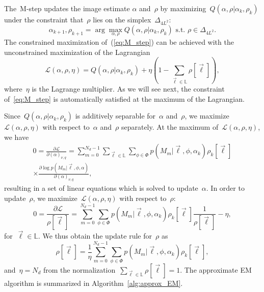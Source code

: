 \documentclass{article}
\begin{document}
The~\mbox{M-step} updates the image estimate $\alpha$ and~$\rho$ by maximizing~$Q(\alpha, \rho|\alpha_k, \rho_k)$ under the constraint that~$\rho$ lies on the simplex~$\Delta_{4L^2}$:
\begin{equation}
\label{eq:M_step}
\alpha_{k+1}, \rho_{k+1} = \arg \max_{\alpha, \rho} Q(\alpha, \rho|\alpha_k, \rho_k) \text{ s.t. } \rho \in \Delta_{4L^2}.
\end{equation}
The constrained maximization of~(\ref{eq:M_step}) can be achieved with the unconstrained maximization of the Lagrangian
\begin{equation}
\mathcal{L}(\alpha, \rho, \eta) = Q(\alpha, \rho|\alpha_k, \rho_k) + \eta \left(1 - \sum_{\vec{\ell} \in \mathbb{L}} \rho[\vec{\ell}] \right),
\end{equation}
where~$\eta$ is the Lagrange multiplier. As we will see next, the constraint of~\eqref{eq:M_step} is automatically satisfied at the   maximum of the Lagrangian.

 Since~$Q(\alpha, \rho|\alpha_k, \rho_k)$ is additively separable for~$\alpha$ and~$\rho$, we maximize~$\mathcal{L}(\alpha, \rho, \eta)$ with respect to~$\alpha$ and~$\rho$ separately. At the maximum of~$\mathcal{L}(\alpha, \rho, \eta)$, we have
\begin{multline}
\label{eq:update_alpha}
0 = \frac{\partial \mathcal{L}}{\partial{(\alpha)_{\nu, q}}} =  \sum_{m = 0}^{N_d - 1} \sum_{\vec{\ell} \in \mathbb{L}} \sum_{\phi \in \Phi} p(M_m|\vec{\ell}, \phi, \alpha_k) \rho_k[\vec{\ell}] \\ \times \frac{\partial \log p(M_m|\vec{\ell}, \phi, \alpha)}{\partial{(\alpha)_{\nu, q}}},
\end{multline}
resulting in a set of linear equations which is solved to update~$\alpha$. In order to update~$\rho$, we maximize~$\mathcal{L}(\alpha, \rho, \eta)$ with
respect to~$\rho$:
\begin{equation}
0 = \frac{\partial \mathcal{L}}{\mathcal \rho[\vec{\ell}]} = \sum_{m = 0}^{N_d - 1} \sum_{\phi \in \Phi} p(M_m|\vec{\ell}, \phi, \alpha_k) \rho_k[\vec{\ell}] \frac{1}{\rho[\vec{\ell}]} - \eta,
\end{equation}
for~$\vec{\ell} \in \mathbb{L}$. We thus obtain the update rule for~$\rho$ as
\begin{equation}
\label{eq:update_rho}
\rho[\vec{\ell}] = \frac{1}{\eta} \sum_{m = 0}^{N_d - 1} \sum_{\phi \in \Phi} p(M_m|\vec{\ell}, \phi, \alpha_k) \rho_k[\vec{\ell}],
\end{equation}
and~$\eta = N_d$ from the normalization~\mbox{$\sum_{\vec{\ell} \in \mathbb{L}} \rho[\vec{\ell}] = 1$}. The approximate EM algorithm is summarized in Algorithm~\ref{alg:approx_EM}.
\end{document}
